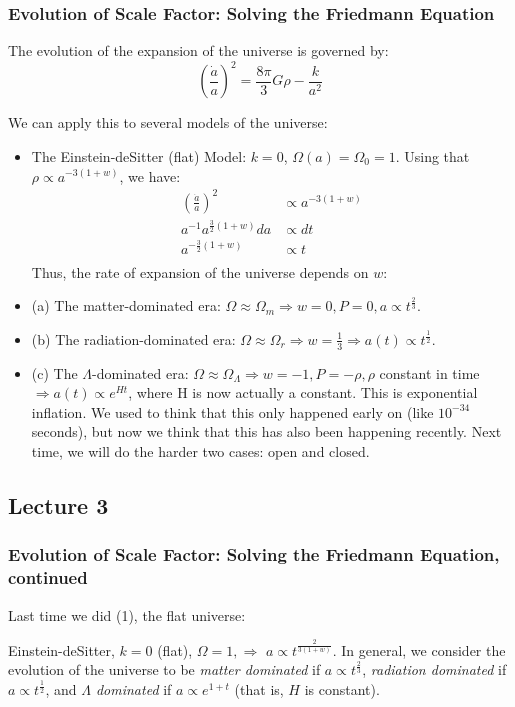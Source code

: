 \documentclass{article}
\def\hf{\frac12}
\def\imply{\Rightarrow}
\def\inv#1{\frac{1}{ #1}}
\def\aa{\frac{\dot a }{ a}}
\def\epot{\frac{8\pi}{ 3}}
\def\athow{a^{-\frac{3}{2}(1+w)}}
\def\atow{a^{-3(1+w)}}
\def\hf{\frac12}
\def\imply{\Rightarrow}
\def\atow{a^{-3(1+w)}}
\def\paap{\left(\aa\right)}
\begin{document}
\subsubsection{ Evolution of Scale Factor: Solving the Friedmann Equation}

The evolution of the expansion of the universe is governed by:
$$\paap^2=\epot G\rho-\frac{k}{ a^2}$$

We can apply this to several models of the universe:
\begin{itemize}
\item The Einstein-deSitter (flat) Model: $k=0$, $\Omega(a)=\Omega_0=1$.
Using that $\rho\propto\atow$, we have:
\begin{align}
\paap^2&\propto\atow\\
a^{-1}a^{\frac{3}{ 2}(1+w)}da&\propto dt\\
\athow&\propto t\\
\end{align}$$
$$
Thus, the rate of expansion of the universe depends on $w$:
\item{(a)} The matter-dominated era: 
$\Omega\approx\Omega_m\imply w=0, P=0, a\propto t^\frac{2 }{ 3}$.
\item{(b)} The radiation-dominated era: 
$\Omega\approx\Omega_r\imply w=\inv{3} \imply a(t)\propto t^\hf$.
\item{(c)} The $\Lambda$-dominated era: 
$\Omega\approx\Omega_\Lambda\imply w=-1, P=-\rho, \rho$ constant in time
$\imply a(t)\propto e^{Ht}$, where H is now actually a constant.  This
is exponential inflation.  We used to think that this only happened early on 
(like $10^{-34}$
seconds), but now we think that this has also been happening recently.
Next time, we will do the harder two cases: open and closed.
\end{itemize}

\subsection{Lecture 3}

\subsubsection{ Evolution of Scale Factor: Solving the Friedmann Equation, continued }

Last time we did (1), the flat universe:

Einstein-deSitter, $k=0$ (flat), $\Omega =1,\imply$
 $a\propto t^\frac{2}{ 3(1+w)}$. In general, we consider the evolution of
the universe to be {\it matter dominated} if $a\propto t^\frac{2}{ 3}$,
{\it radiation dominated} if $a \propto t^{\hf}$, and 
{\it $\Lambda$ dominated} if $a \propto e^{1+t}$ (that is, $H$ is constant).
\end{document}
